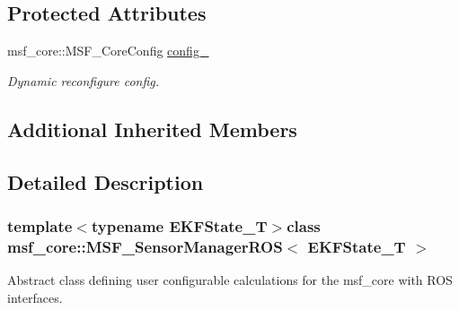 \subsection*{Protected Attributes}
\begin{DoxyCompactItemize}
\item 
\hypertarget{structmsf__core_1_1MSF__SensorManagerROS_aa35b7b94cdf025302d7f980f2e68f413}{msf\-\_\-core\-::\-M\-S\-F\-\_\-\-Core\-Config \hyperlink{structmsf__core_1_1MSF__SensorManagerROS_aa35b7b94cdf025302d7f980f2e68f413}{config\-\_\-}}\label{structmsf__core_1_1MSF__SensorManagerROS_aa35b7b94cdf025302d7f980f2e68f413}

\begin{DoxyCompactList}\small\item\em Dynamic reconfigure config. \end{DoxyCompactList}\end{DoxyCompactItemize}
\subsection*{Additional Inherited Members}


\subsection{Detailed Description}
\subsubsection*{template$<$typename E\-K\-F\-State\-\_\-\-T$>$class msf\-\_\-core\-::\-M\-S\-F\-\_\-\-Sensor\-Manager\-R\-O\-S$<$ E\-K\-F\-State\-\_\-\-T $>$}

Abstract class defining user configurable calculations for the msf\-\_\-core with R\-O\-S interfaces. 

